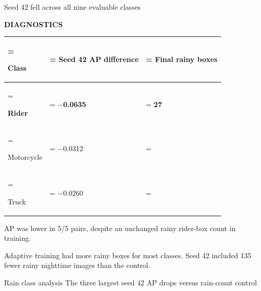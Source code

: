 \documentclass[aspectratio=169,11pt]{beamer}
\newcommand{\credit}[1]{\vfill{\scriptsize\color{muted}#1\par}}
\newcommand{\talkpoint}[2]{%
  \smallskip{\color{accent}\bfseries #1}\enspace #2\par}
\begin{document}
\begin{frame}[t]{Seed 42 fell across all nine evaluable classes}
{\scriptsize\bfseries\color{accent}DIAGNOSTICS\par}
\smallskip
\smallskip
{\small
\begin{tabularx}{\linewidth}{>{\hsize=1.1400\hsize\linewidth=\hsize\raggedright\arraybackslash}X>{\hsize=1.0200\hsize\linewidth=\hsize\centering\arraybackslash}X>{\hsize=0.8400\hsize\linewidth=\hsize\centering\arraybackslash}X}
\toprule
\textcolor{accent}{\textbf{Class}} & \textcolor{accent}{\textbf{Seed 42 AP difference}} & \textcolor{accent}{\textbf{Final rainy boxes}} \\
\midrule
\textbf{Rider} & \textbf{\ensuremath{-}0.0635} & \textbf{27} \\
Motorcycle & \ensuremath{-}0.0312 & 22 \\
Truck & \ensuremath{-}0.0260 & 262 \\
\bottomrule
\end{tabularx}
\par}
\talkpoint{Rider}{AP was lower in 5/5 pairs, despite an unchanged rainy rider-box count in training.}
\talkpoint{Composition}{Adaptive training had more rainy boxes for most classes. Seed 42 included 135 fewer rainy nighttime images than the control.}
\credit{Rain class analysis \textperiodcentered{} The three largest seed 42 AP drops versus rain-count control}
\end{frame}
\end{document}
